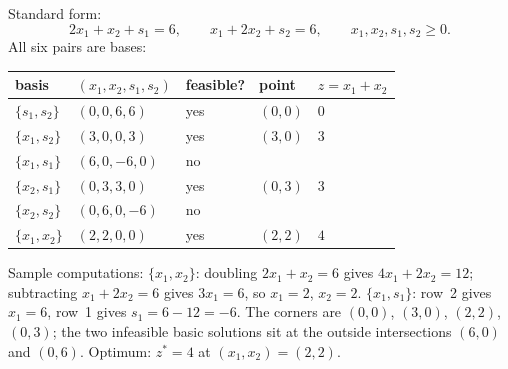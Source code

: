 \begin{solutions}
  \item Standard form:
        \[
          2x_{1}+x_{2}+s_{1}=6,\qquad
          x_{1}+2x_{2}+s_{2}=6,\qquad
          x_{1},x_{2},s_{1},s_{2}\ge 0 .
        \]
        All six pairs are bases:
        \begin{center}
        \begin{tabular}{lllll}
          \hline
          basis & $(x_{1},x_{2},s_{1},s_{2})$ & feasible? &
          point & $z=x_{1}+x_{2}$\\
          \hline
          $\{s_{1},s_{2}\}$ & $(0,0,6,6)$ & yes & $(0,0)$ & $0$\\
          $\{x_{1},s_{2}\}$ & $(3,0,0,3)$ & yes & $(3,0)$ & $3$\\
          $\{x_{1},s_{1}\}$ & $(6,0,-6,0)$ & no & & \\
          $\{x_{2},s_{1}\}$ & $(0,3,3,0)$ & yes & $(0,3)$ & $3$\\
          $\{x_{2},s_{2}\}$ & $(0,6,0,-6)$ & no & & \\
          $\{x_{1},x_{2}\}$ & $(2,2,0,0)$ & yes & $(2,2)$ & $4$\\
          \hline
        \end{tabular}
        \end{center}
        Sample computations: $\{x_{1},x_{2}\}$: doubling
        $2x_{1}+x_{2}=6$ gives $4x_{1}+2x_{2}=12$; subtracting
        $x_{1}+2x_{2}=6$ gives $3x_{1}=6$, so $x_{1}=2$, $x_{2}=2$.
        $\{x_{1},s_{1}\}$: row~2 gives $x_{1}=6$, row~1 gives
        $s_{1}=6-12=-6$. The corners are $(0,0)$, $(3,0)$, $(2,2)$,
        $(0,3)$; the two infeasible basic solutions sit at the outside
        intersections $(6,0)$ and $(0,6)$. Optimum: $z^{*}=4$ at
        $(x_{1},x_{2})=(2,2)$.


\end{solutions}
